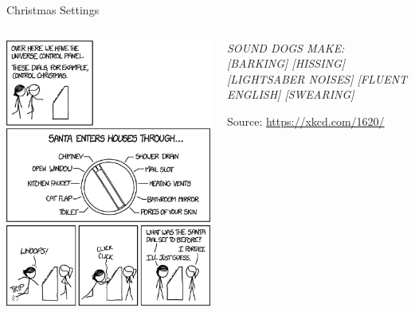 
\begin{frame}[t,plain]
\titlepage
\end{frame}


\begin{frame}{Christmas Settings}
%
\begin{columns}[T]
\vspace{-12pt}
\begin{center}
	\includegraphics[width=.7\linewidth]{./gfx/10-xkcd-christmas-settings}
\end{center}
%
\vspace{+40pt}
\begin{center}
	\emph{SOUND DOGS MAKE: [BARKING] [HISSING] [LIGHTSABER NOISES] [FLUENT ENGLISH] [SWEARING]}
	
	\vspace{12pt}
	Source: \url{https://xkcd.com/1620/}
\end{center}
\end{columns}
%
\end{frame}


